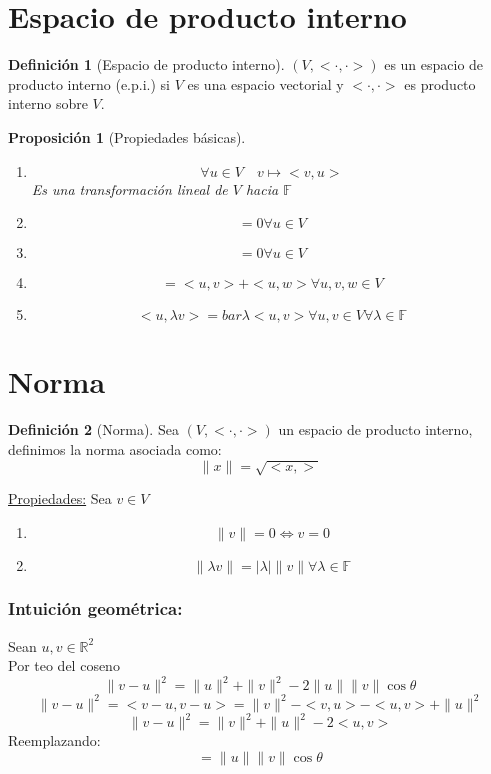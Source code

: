 \documentclass[11pt]{book}
\newcommand{\set}[1]{\mathbb{#1}}
\newtheorem{prop}[thm]{Proposición}
\theoremstyle{definition}
\newtheorem{defn}{Definición}[section]
\begin{document}
\section{Espacio de producto interno}
\begin{defn}[Espacio de producto interno]
	$(V,<\cdot,\cdot>)$ es un espacio de producto interno (e.p.i.) si $V$ es una espacio vectorial y $<\cdot,\cdot>$ es producto interno sobre $V$.
\end{defn}
\begin{prop}[Propiedades básicas]
	\
	\begin{enumerate}[label=(\alph*)]
		\item \[\forall u\in V\quad v\mapsto <v,u> \]
		Es una transformación lineal de $V$ hacia $\set{F}$

		\item \[<0,u>=0\forall u\in V\]

		\item \[<u,0>=0\forall u\in V\]

		\item \[<u,v+w>=<u,v>+<u,w>\forall u,v,w\in V\]

		\item \[<u,\lambda v>=bar{\lambda}<u,v>\forall u,v\in V \forall \lambda\in\set{F}\]
	\end{enumerate}
\end{prop}
\section{Norma}
\begin{defn}[Norma]
	Sea $(V,<\cdot,\cdot>)$ un espacio de producto interno, definimos la norma asociada como:
	\[\|x\|=\sqrt{<x,>}\]
\end{defn}
\underline{Propiedades:} Sea $v\in V$
\begin{enumerate}[label=(\alph*)]
	\item \[\|v\|=0\iff v=0\]

	\item \[\|\lambda v\|=|\lambda|\|v\|\forall \lambda\in \set{F}\]
\end{enumerate}
\subsubsection{Intuición geométrica:}
Sean $u,v\in\set{R}^2$\\
Por teo del coseno
\[\|v-u\|^2=\|u\|^2+\|v\|^2-2\|u\|\|v\|\cos\theta\]
\[\|v-u\|^2=<v-u,v-u>=\|v\|^2-<v,u>-<u,v>+\|u\|^2\]
\[\|v-u\|^2=\|v\|^2+\|u\|^2-2<u,v>\]
Reemplazando:
\[<u,v>=\|u\|\|v\|\cos\theta\]
\end{document}
